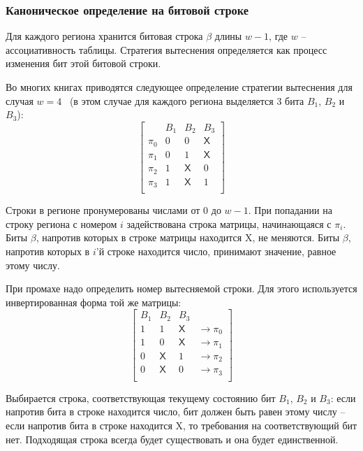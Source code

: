 \subsubsection{Каноническое определение \PseudoLRU на битовой строке}

Для каждого региона хранится битовая строка $\beta$ длины $w-1$, где $w$ --
ассоциативность таблицы. Стратегия вытеснения определяется как процесс изменения
бит этой битовой строки.

Во многих книгах приводятся следующее определение стратегии
вытеснения \PseudoLRU для случая
$w=4$~\cite{FundamentalOfComputerOrganizationAndDesign} (в этом
случае для каждого региона выделяется 3 бита $B_1$, $B_2$ и $B_3$):
$$ \left[
  \begin{array}{c|ccc}
          & B_1 & B_2 & B_3 \\ \hline
    \pi_0 & 0 & 0 & \textsf{X} \\
    \pi_1 & 0 & 1 & \textsf{X} \\
    \pi_2 & 1 & \textsf{X} & 0 \\
    \pi_3 & 1 & \textsf{X} & 1 \\
  \end{array}
\right]
$$

Строки в регионе пронумерованы числами от 0 до $w-1$. При попадании на строку
региона с номером $i$ задействована строка матрицы, начинающаяся с $\pi_i$. Биты
$\beta$, напротив которых в строке матрицы находится \textsf{X}, не меняются.
Биты $\beta$, напротив которых в $i$'й строке находится число, принимают
значение, равное этому числу.

При промахе надо определить номер вытесняемой строки. Для этого используется
инвертированная форма той же матрицы:
$$
\left[
  \begin{array}{ccc|c}
    B_1 & B_2 & B_3 & \\ \hline
    1 & 1 & \textsf{X} & \rightarrow \pi_0 \\
    1 & 0 & \textsf{X} & \rightarrow \pi_1 \\
    0 & \textsf{X} & 1 & \rightarrow \pi_2 \\
    0 & \textsf{X} & 0 & \rightarrow \pi_3 \\
  \end{array}
\right]
$$

Выбирается строка, соответствующая текущему состоянию бит $B_1$,
$B_2$ и $B_3$: если напротив бита в строке находится число, бит
должен быть равен этому числу -- если напротив бита в строке
находится \textsf{X}, то требования на соответствующий бит нет.
Подходящая строка всегда будет существовать и она будет
единственной.

